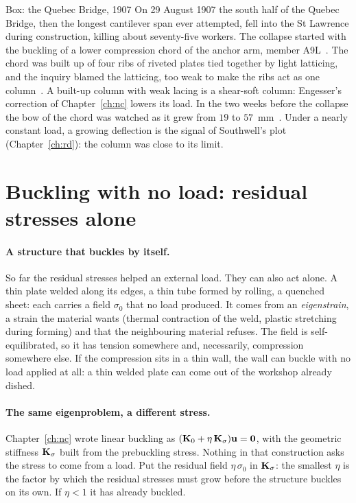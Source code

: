 \begin{gbox}{Box: the Quebec Bridge, 1907}\label{sec:tw-quebec}
%
On 29 August 1907 the south half of the Quebec Bridge, then the longest cantilever span ever attempted,
fell into the St Lawrence during construction, killing about seventy-five workers. The collapse started
with the buckling of a lower compression chord of the anchor arm, member A9L~\cite{tw-pearson2006}. The
chord was built up of four ribs of riveted plates tied together by light latticing, and the inquiry blamed
the latticing, too weak to make the ribs act as one column~\cite{tw-pearson2006,tw-brady2019}. A built-up column with weak
lacing is a shear-soft column: Engesser's correction of Chapter~\ref{ch:nc} lowers its load. In the two
weeks before the collapse the bow of the chord was watched as it grew from $19$ to $57$~mm~\cite{tw-brady2019}. Under a
nearly constant load, a growing deflection is the signal of Southwell's plot (Chapter~\ref{ch:rd}): the
column was close to its limit.
\end{gbox}

\section{Buckling with no load: residual stresses alone}\label{sec:tw-selfstress}
%

\paragraph{A structure that buckles by itself.}
So far the residual stresses helped an external load. They can also act alone. A thin plate welded
along its edges, a thin tube formed by rolling, a quenched sheet: each carries a field $\sigma_0$ that no
load produced. It comes from an \emph{eigenstrain}, a strain the material wants (thermal contraction of
the weld, plastic stretching during forming) and that the neighbouring material refuses. The field is
self-equilibrated, so it has tension somewhere and, necessarily, compression somewhere else. If the
compression sits in a thin wall, the wall can buckle with no load applied at all: a thin welded plate can come out of
the workshop already dished.

\paragraph{The same eigenproblem, a different stress.}
Chapter~\ref{ch:nc} wrote linear buckling as $(\mathbf{K}_0 + \eta\,\mathbf{K}_\sigma)\mathbf{u} = \mathbf{0}$, with the
geometric stiffness $\mathbf{K}_\sigma$ built from the prebuckling stress. Nothing in that construction asks the
stress to come from a load. Put the residual field $\eta\,\sigma_0$ in $\mathbf{K}_\sigma$: the smallest $\eta$ is the
factor by which the residual stresses must grow before the structure buckles on its own. If $\eta < 1$ it
has already buckled.

